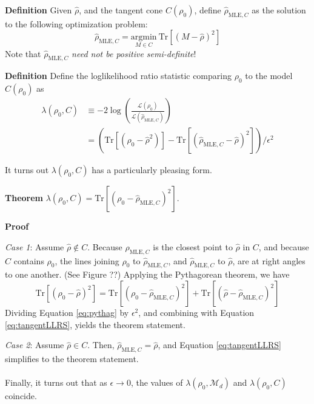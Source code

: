 \documentclass[aps,pra, twocolumn]{revtex4-1}
\newcommand{\M}{\mathcal{M}}
\newcommand{\rhohat}{\hat{\rho}}
\begin{document}
\textbf{Definition} Given $\hat{\rho}$, and the tangent cone $C(\rho_{0})$, define $\hat{\rho}_{\mathrm{MLE}, C}$ as the solution to the following optimization problem:
\begin{equation}
\hat{\rho}_{\mathrm{MLE}, C} = \underset{M \in C}{\text{argmin}}~\mathrm{Tr}[(M - \rhohat)^{2}]
\end{equation}
Note that $\hat{\rho}_{\mathrm{MLE}, C}$ \emph{need not be positive semi-definite}!

\textbf{Definition} Define the loglikelihood ratio statistic comparing $\rho_{0}$ to the model $C(\rho_{0})$ as 
\begin{align}
\nonumber\lambda(\rho_{0}, C) &\equiv -2 \log \left(\frac{\mathcal{L}(\rho_{0})}{\mathcal{L}(\hat{\rho}_{\mathrm{MLE}, C})}\right)\\
\label{eq:tangentLLRS}
& = (\mathrm{Tr}[(\rho_{0} - \rhohat^{2})] - \mathrm{Tr}[(\hat{\rho}_{\mathrm{MLE}, C} - \rhohat)^{2}])/\epsilon^{2}
\end{align}


It turns out $\lambda(\rho_{0}, C)$ has a particularly pleasing form.

\textbf{Theorem} $\lambda(\rho_{0}, C) = \mathrm{Tr}[(\rho_{0} - \hat{\rho}_{\mathrm{MLE}, C})^{2}]$.

\textbf{Proof}

\emph{Case 1}: Assume $\rhohat \not \in C$. Because $\hat{\rho}_{\mathrm{MLE}, C}$ is the closest point to $\rhohat$ in $C$, and because $C$ contains $\rho_{0}$, the lines joining $\rho_{0}$ to $\hat{\rho}_{\mathrm{MLE}, C}$, and $\hat{\rho}_{\mathrm{MLE}, C}$ to $\rhohat$, are at right angles to one another. (See Figure ??) Applying the Pythagorean theorem, we have
\begin{equation}
\label{eq:pythag}
\mathrm{Tr}[(\rho_{0} - \rhohat)^{2}] = \mathrm{Tr}[(\rho_{0} - \hat{\rho}_{\mathrm{MLE}, C})^{2}] + \mathrm{Tr}[(\rhohat - \hat{\rho}_{\mathrm{MLE}, C})^{2}]
\end{equation}
Dividing Equation \eqref{eq:pythag} by $\epsilon^{2}$, and combining with Equation \eqref{eq:tangentLLRS}, yields the theorem statement.

\emph{Case 2}: Assume $\rhohat \in C$. Then, $\hat{\rho}_{\mathrm{MLE}, C} = \rhohat$, and Equation \eqref{eq:tangentLLRS} simplifies to the theorem statement.
~\\~\\
Finally, it turns out that as $\epsilon \rightarrow 0$, the values of $\lambda(\rho_{0}, \M_{d})$ and $\lambda(\rho_{0}, C)$ coincide.
\end{document}
